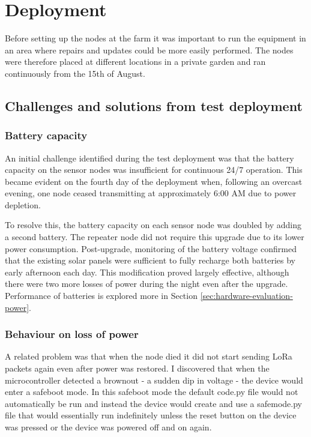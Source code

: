 \section{Deployment}\label{sec:deployment}

Before setting up the nodes at the farm it was important to run the equipment in
an area where repairs and updates could be more easily performed. The nodes were
therefore placed at different locations in a private garden and ran continuously
from the 15th of August.

\subsection{Challenges and solutions from test deployment}

\subsubsection{Battery capacity}\label{sec:increase-battery-cap}

An initial challenge identified during the test deployment was that the battery
capacity on the sensor nodes was insufficient for continuous 24/7 operation.
This became evident on the fourth day of the deployment when, following an
overcast evening, one node ceased transmitting at approximately 6:00 AM due to
power depletion.

To resolve this, the battery capacity on each sensor node was doubled by adding
a second battery. The repeater node did not require this upgrade due to its
lower power consumption. Post-upgrade, monitoring of the battery voltage
confirmed that the existing solar panels were sufficient to fully recharge both
batteries by early afternoon each day. This modification proved largely
effective, although there were two more losses of power during the night even
after the upgrade. Performance of batteries is explored more in Section
\ref{sec:hardware-evaluation-power}.

\subsubsection {Behaviour on loss of power}

A related problem was that when the node died it did not start sending LoRa
packets again even after power was restored. I discovered that when the
microcontroller detected a brownout - a sudden dip in voltage - the device would
enter a safeboot mode. In this safeboot mode the default code.py file would not
automatically be run and instead the device would create and use a safemode.py
file that would essentially run indefinitely unless the reset button on the
device was pressed or the device was powered off and on again.

